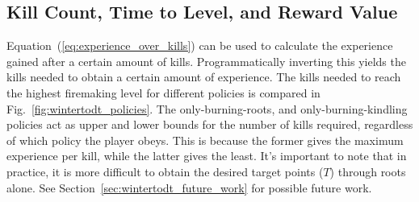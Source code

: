	\subsection{Kill Count, Time to Level, and Reward Value}
		Equation~(\ref{eq:experience_over_kills}) can be used to calculate the experience gained after a certain amount of kills. Programmatically inverting this yields the kills needed to obtain a certain amount of experience. The kills needed to reach the highest firemaking level for different policies is compared in Fig.~\ref{fig:wintertodt_policies}. The only-burning-roots, and only-burning-kindling policies act as upper and lower bounds for the number of kills required, regardless of which policy the player obeys. This is because the former gives the maximum experience per kill, while the latter gives the least. It's important to note that in practice, it is more difficult to obtain the desired target points ($T$) through roots alone. See Section~\ref{sec:wintertodt_future_work} for possible future work.

